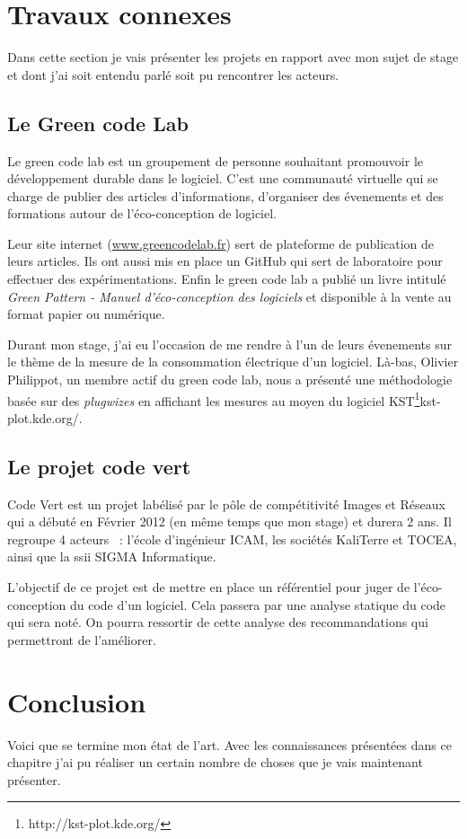 \documentclass[a4paper, 11pt]{report}
\begin{document}
	\section{Travaux connexes}
Dans cette section je vais présenter les projets en rapport avec mon sujet de stage et dont j'ai soit entendu parlé soit pu rencontrer les acteurs.
		\subsection{Le Green code Lab}
Le green code lab est un groupement de personne souhaitant promouvoir le développement durable dans le logiciel. C'est une communauté virtuelle qui se charge de publier des articles d'informations, d'organiser des évenements et des formations autour de l'éco-conception de logiciel.

Leur site internet (\href{http://www.greencodelab.fr}{www.greencodelab.fr}) sert de plateforme de publication de leurs articles. Ils ont aussi mis en place un GitHub qui sert de laboratoire pour effectuer des expérimentations. Enfin le green code lab a publié un livre intitulé \textit{Green Pattern - Manuel d'éco-conception des logiciels} et disponible à la vente au format papier ou numérique.

Durant mon stage, j'ai eu l'occasion de me rendre à l'un de leurs évenements sur le thème de la mesure de la consommation électrique d'un logiciel. Là-bas, Olivier Philippot, un membre actif du green code lab, nous a présenté une méthodologie basée sur des \textit{plugwizes} en affichant les mesures au moyen du logiciel KST\footnote{http://kst-plot.kde.org/}{kst-plot.kde.org/}.
		\subsection{Le projet code vert}
Code Vert est un projet labélisé par le pôle de compétitivité Images et Réseaux qui a débuté en Février 2012 (en même temps que mon stage) et durera 2 ans. Il regroupe 4 acteurs ~: l'école d'ingénieur ICAM, les sociétés KaliTerre et TOCEA, ainsi que la ssii SIGMA Informatique.

L'objectif de ce projet est de mettre en place un référentiel pour juger de l'éco-conception du code d'un logiciel. Cela passera par une analyse statique du code qui sera noté. On pourra ressortir de cette analyse des recommandations qui permettront de l'améliorer.
		
	\section{Conclusion}
Voici que se termine mon état de l'art. Avec les connaissances présentées dans ce chapitre j'ai pu réaliser un certain nombre de choses que je vais maintenant présenter.
\end{document}
